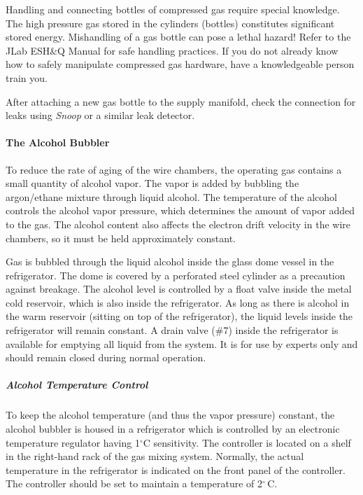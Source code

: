 Handling and connecting bottles of compressed gas require special
knowledge.  The high pressure gas stored in the cylinders (bottles)
constitutes significant stored energy. Mishandling of a gas bottle can
pose a lethal hazard! Refer to the JLab ESH\&Q Manual
for safe handling practices. If you do not already know how to safely
manipulate compressed gas hardware, have a knowledgeable person train
you.

After attaching a new gas bottle to the supply manifold, check the
connection for leaks using \emph{Snoop} or a similar leak detector.

\paragraph{The Alcohol Bubbler}

To reduce the rate of aging of the wire chambers, the operating gas
contains a small quantity of alcohol vapor. The vapor is added by
bubbling the argon/ethane mixture through liquid alcohol. The
temperature of the alcohol controls the alcohol vapor pressure, which
determines the amount of vapor added to the gas. The alcohol content
also affects the electron drift velocity in the wire chambers, so it
must be held approximately constant.

Gas is bubbled through the liquid alcohol inside the glass
dome vessel in the refrigerator. The dome is covered by a
perforated steel cylinder as a precaution against breakage. The
alcohol level is controlled by a float valve inside the metal cold
reservoir, which is also inside the refrigerator. As long as there is
alcohol in the warm reservoir (sitting on top of the refrigerator),
the liquid levels inside the refrigerator will remain constant. A
drain valve (\#7) inside the refrigerator is available for emptying
all liquid from the system.  It is for use by experts only and should
remain closed during normal operation.

\subparagraph {Alcohol Temperature Control}

To keep the alcohol temperature (and thus the vapor pressure) constant,
the alcohol bubbler is housed in a refrigerator which is controlled by
an electronic temperature regulator having 1$^\circ$C sensitivity. The 
controller is located on a shelf in the right-hand rack of the gas mixing
system. Normally, the actual temperature in the refrigerator is
indicated on the front panel of the controller. The controller should
be set to maintain a temperature of 2$^\circ$\,C.

